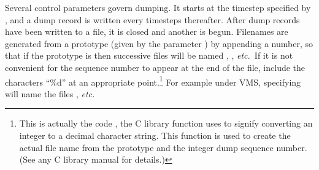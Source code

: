 \documentclass[a4paper,twoside]{report}
\newcommand{\etc}{\emph{etc.}}
\begin{document}
Several control parameters govern dumping. It starts at the timestep
specified by , and a dump record is written every
 timesteps thereafter.  After 
dump records have been written to a file, it is closed and another is
begun. Filenames are generated from a prototype (given by the
parameter ) by appending a number, so that if the
prototype is  then successive files will be named
, ,  \etc\ If it is
not convenient for the sequence number to appear at the end of the
file, include the characters ``\%d'' at an appropriate
point.\footnote{This is actually the code , the C
  library function uses to signify converting an integer to a decimal
  character string. This function is used to create the actual file
  name from the prototype and the integer dump sequence number. (See
  any C library manual for details.)}  For example under VMS,
specifying  will name the files
,  \etc
\end{document}
